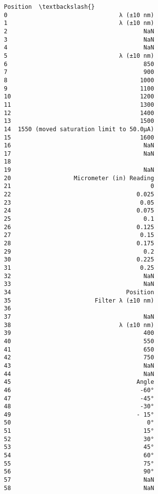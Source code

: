 \documentclass[11pt]{article}
\begin{document}
\begin{tcolorbox}[breakable, size=fbox, boxrule=.5pt, pad at break*=1mm, opacityfill=0]
\begin{Verbatim}[commandchars=\\\{\}]
                                   Position  \textbackslash{}
0                                λ (±10 nm)
1                                λ (±10 nm)
2                                       NaN
3                                       NaN
4                                       NaN
5                                λ (±10 nm)
6                                       850
7                                       900
8                                      1000
9                                      1100
10                                     1200
11                                     1300
12                                     1400
13                                     1500
14  1550 (moved saturation limit to 50.0μA)
15                                     1600
16                                      NaN
17                                      NaN
18                                        ﻿
19                                      NaN
20                  Micrometer (in) Reading
21                                        0
22                                    0.025
23                                     0.05
24                                    0.075
25                                      0.1
26                                    0.125
27                                     0.15
28                                    0.175
29                                      0.2
30                                    0.225
31                                     0.25
32                                      NaN
33                                      NaN
34                                 Position
35                        Filter λ (±10 nm)
36                                        ﻿
37                                      NaN
38                               λ (±10 nm)
39                                      400
40                                      550
41                                      650
42                                      750
43                                      NaN
44                                      NaN
45                                    Angle
46                                     -60°
47                                     -45°
48                                     -30°
49                                    - 15°
50                                       0°
51                                      15°
52                                      30°
53                                      45°
54                                      60°
55                                      75°
56                                      90°
57                                      NaN
58                                      NaN


\end{Verbatim}
\end{tcolorbox}
\end{document}
